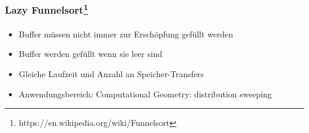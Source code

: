 \documentclass{beamer}
\begin{document}
\begin{frame}
  \frametitle{Lazy Funnelsort\footnote{https://en.wikipedia.org/wiki/Funnelsort}}
  \framesubtitle{}
  
  \begin{itemize}
    \item Buffer müssen nicht immer zur Erschöpfung gefüllt werden
    \item Buffer werden gefüllt wenn sie leer sind
    \item Gleiche Laufzeit und Anzahl an Speicher-Transfers
    \item Anwendungsbereich: Computational Geometry: distribution sweeping
  \end{itemize}
\end{frame}
\end{document}
